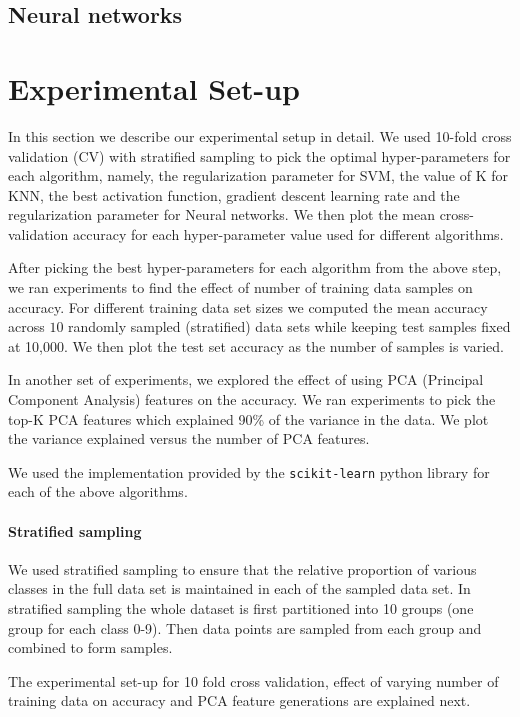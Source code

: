 \documentclass[10pt]{scrartcl}
\begin{document}
\subsection*{Neural networks}


\section*{Experimental Set-up}
In this section we describe our experimental setup in detail.
We used 10-fold cross validation (CV) with stratified sampling to pick the optimal hyper-parameters for each algorithm, namely, 
the regularization parameter for SVM, the value of K for KNN, the best activation function, gradient descent learning rate and the regularization parameter for Neural networks. We then plot the mean cross-validation accuracy for each hyper-parameter value used for different algorithms.

After picking the best hyper-parameters for each algorithm from the above step, we ran experiments to find the effect of number of training data samples on accuracy. 
For different training data set sizes we computed the mean accuracy across $10$ randomly sampled (stratified) data sets
while keeping test samples fixed at 10,000. We then plot the test set accuracy as the number of samples is varied.

In another set of experiments, we explored the effect of using PCA (Principal Component Analysis) features on the accuracy.
We ran experiments to pick the top-K PCA features which explained 90\% of the variance in the data. We plot the variance explained
versus the number of PCA features.

We used the implementation provided by the \texttt{scikit-learn} python library for each of the above algorithms.

\paragraph{Stratified sampling}
We used stratified sampling to ensure that the relative proportion of various classes in the full data set is maintained in each of the sampled
data set. In stratified sampling the whole dataset is first partitioned into 10 groups (one group for each class 0-9). 
Then data points are sampled from each group and combined to form samples.

The experimental set-up for 10 fold cross validation, effect of varying number of training data on accuracy and PCA feature generations are explained next.
 
\end{document}
